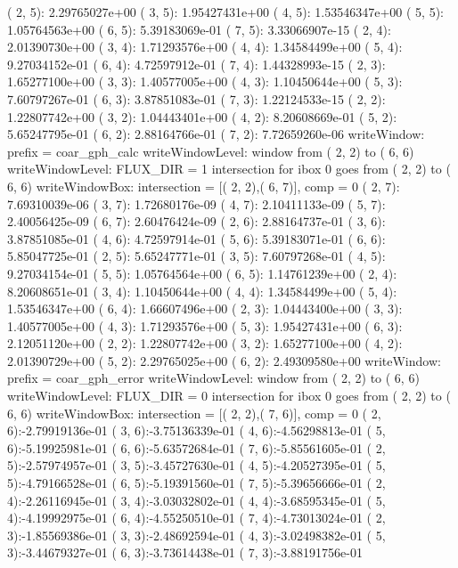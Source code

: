 \begin{itemize}
(  2,  5): 2.29765027e+00  (  3,  5): 1.95427431e+00  (  4,  5): 1.53546347e+00  (  5,  5): 1.05764563e+00  (  6,  5): 5.39183069e-01  (  7,  5): 3.33066907e-15  
(  2,  4): 2.01390730e+00  (  3,  4): 1.71293576e+00  (  4,  4): 1.34584499e+00  (  5,  4): 9.27034152e-01  (  6,  4): 4.72597912e-01  (  7,  4): 1.44328993e-15  
(  2,  3): 1.65277100e+00  (  3,  3): 1.40577005e+00  (  4,  3): 1.10450644e+00  (  5,  3): 7.60797267e-01  (  6,  3): 3.87851083e-01  (  7,  3): 1.22124533e-15  
(  2,  2): 1.22807742e+00  (  3,  2): 1.04443401e+00  (  4,  2): 8.20608669e-01  (  5,  2): 5.65247795e-01  (  6,  2): 2.88164766e-01  (  7,  2): 7.72659260e-06  
writeWindow: prefix = coar_gph_calc      
writeWindowLevel:  window from (  2,  2) to (  6,  6)
writeWindowLevel: FLUX_DIR = 1
 intersection for ibox  0 goes from (  2,  2) to (  6,  6)
writeWindowBox: intersection = [(  2,  2),(  6,  7)], comp = 0
(  2,  7): 7.69310039e-06  (  3,  7): 1.72680176e-09  (  4,  7): 2.10411133e-09  (  5,  7): 2.40056425e-09  (  6,  7): 2.60476424e-09  
(  2,  6): 2.88164737e-01  (  3,  6): 3.87851085e-01  (  4,  6): 4.72597914e-01  (  5,  6): 5.39183071e-01  (  6,  6): 5.85047725e-01  
(  2,  5): 5.65247771e-01  (  3,  5): 7.60797268e-01  (  4,  5): 9.27034154e-01  (  5,  5): 1.05764564e+00  (  6,  5): 1.14761239e+00  
(  2,  4): 8.20608651e-01  (  3,  4): 1.10450644e+00  (  4,  4): 1.34584499e+00  (  5,  4): 1.53546347e+00  (  6,  4): 1.66607496e+00  
(  2,  3): 1.04443400e+00  (  3,  3): 1.40577005e+00  (  4,  3): 1.71293576e+00  (  5,  3): 1.95427431e+00  (  6,  3): 2.12051120e+00  
(  2,  2): 1.22807742e+00  (  3,  2): 1.65277100e+00  (  4,  2): 2.01390729e+00  (  5,  2): 2.29765025e+00  (  6,  2): 2.49309580e+00  
writeWindow: prefix = coar_gph_error     
writeWindowLevel:  window from (  2,  2) to (  6,  6)
writeWindowLevel: FLUX_DIR = 0
 intersection for ibox  0 goes from (  2,  2) to (  6,  6)
writeWindowBox: intersection = [(  2,  2),(  7,  6)], comp = 0
(  2,  6):-2.79919136e-01  (  3,  6):-3.75136339e-01  (  4,  6):-4.56298813e-01  (  5,  6):-5.19925981e-01  (  6,  6):-5.63572684e-01  (  7,  6):-5.85561605e-01  
(  2,  5):-2.57974957e-01  (  3,  5):-3.45727630e-01  (  4,  5):-4.20527395e-01  (  5,  5):-4.79166528e-01  (  6,  5):-5.19391560e-01  (  7,  5):-5.39656666e-01  
(  2,  4):-2.26116945e-01  (  3,  4):-3.03032802e-01  (  4,  4):-3.68595345e-01  (  5,  4):-4.19992975e-01  (  6,  4):-4.55250510e-01  (  7,  4):-4.73013024e-01  
(  2,  3):-1.85569386e-01  (  3,  3):-2.48692594e-01  (  4,  3):-3.02498382e-01  (  5,  3):-3.44679327e-01  (  6,  3):-3.73614438e-01  (  7,  3):-3.88191756e-01  

\end{itemize}
